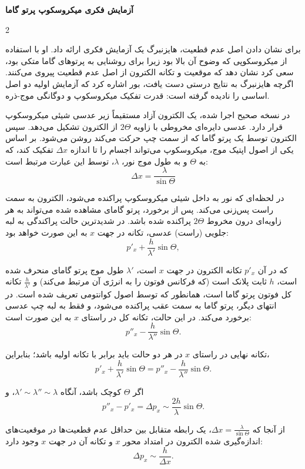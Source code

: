 \documentclass[11pt,a4paper]{article}
\begin{document}
\newpage
\begin{framed}
\begin{center}
    {\Large \textbf{آزمایش فکری میکروسکوپ پرتو گاما}}
\end{center}

\begin{multicols}{2}

\noindent برای نشان دادن اصل عدم قطعیت، هایزنبرگ یک آزمایش فکری ارائه داد. او با استفاده از میکروسکوپی که وضوح آن بالا بود زیرا برای روشنایی به پرتوهای گاما متکی بود، سعی کرد نشان دهد که موقعیت و تکانه الکترون از اصل عدم قطعیت پیروی می‌کنند. اگرچه هایزنبرگ به نتایج درستی دست یافت، بور اشاره کرد که آزمایش اولیه دو اصل اساسی را نادیده گرفته است: قدرت تفکیک میکروسکوپ و دوگانگی موج-ذره.

در نسخه صحیح اجرا شده، یک الکترون آزاد مستقیماً زیر عدسی شیئی میکروسکوپ قرار دارد. عدسی دایره‌ای مخروطی با زاویه $2\Theta$ از الکترون تشکیل می‌دهد. سپس الکترون توسط یک پرتو گاما که از سمت چپ حرکت می‌کند روشن می‌شود. بر اساس یکی از اصول اپتیک موج، میکروسکوپ می‌تواند اجسام را تا اندازه $\Delta x$ تفکیک کند، که به $\Theta$ و به طول موج نور، $\lambda$، توسط این عبارت مرتبط است:
$$ \Delta x = \frac{\lambda}{\sin \Theta} $$

در لحظه‌ای که نور به داخل شیئی میکروسکوپ پراکنده می‌شود، الکترون به سمت راست پس‌زنی می‌کند. پس از برخورد، پرتو گامای مشاهده شده می‌تواند به هر زاویه‌ای درون مخروط $2\Theta$ پراکنده شده باشد. در شدیدترین حالت پراکندگی به لبه جلویی (راست) عدسی، تکانه در جهت $x$ به این صورت خواهد بود:
$$ p'_x + \frac{h}{\lambda'} \sin \Theta, $$

\columnbreak

\noindent که در آن $p'_x$ تکانه الکترون در جهت $x$ است، $\lambda'$ طول موج پرتو گامای منحرف شده است، $h$ ثابت پلانک است (که فرکانس فوتون را به انرژی آن مرتبط می‌کند) و $\frac{h}{\lambda'}$ تکانه کل فوتون پرتو گاما است، همانطور که توسط اصول کوانتومی تعریف شده است. در انتهای دیگر، پرتو گاما به سمت عقب پراکنده می‌شود، و فقط به لبه چپ عدسی برخورد می‌کند. در این حالت، تکانه کل در راستای $x$ به این صورت است:
$$ p''_x - \frac{h}{\lambda''} \sin \Theta. $$

تکانه نهایی در راستای $x$ در هر دو حالت باید برابر با تکانه اولیه باشد؛ بنابراین،
$$ p'_x + \frac{h}{\lambda'} \sin \Theta = p''_x - \frac{h}{\lambda''} \sin \Theta. $$

اگر $\Theta$ کوچک باشد، آنگاه $\lambda' \sim \lambda'' \sim \lambda$، و
$$ p''_x - p'_x = \Delta p_x \sim \frac{2h}{\lambda} \sin \Theta. $$

از آنجا که $\Delta x = \frac{\lambda}{\sin \Theta}$، یک رابطه متقابل بین حداقل عدم قطعیت‌ها در موقعیت‌های اندازه‌گیری شده الکترون در امتداد محور $x$ و تکانه آن در جهت $x$ وجود دارد:
$$ \Delta p_x \sim \frac{h}{\Delta x}. $$


\end{multicols}
\end{framed}
\end{document}
